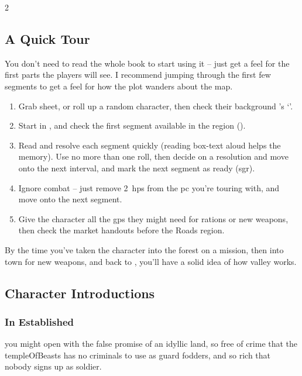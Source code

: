 \begin{multicols}{2}

\subsection{A Quick Tour}

You don't need to read the whole book to start using it -- just get a feel for the first parts the players will see.
I recommend jumping through the first few \glspl{segment} to get a feel for how the plot wanders about the map.

\begin{enumerate}
  \item
  Grab  sheet, or roll up a random character, then check their background 's `'.
  \item
  Start in  , and check the first \gls{segment} available in the \gls{region} ().
  \item
  Read and resolve each \gls{segment} quickly (reading box-text aloud helps the memory).
  Use no more than one roll, then decide on a resolution and move onto the next \gls{interval}, and mark the next \gls{segment} as ready (\gls{sgr}).
  \item
  Ignore combat -- just remove 2~\glspl{hp} from the \gls{pc} you're touring with, and move onto the next \gls{segment}.
  \item
  Give the character all the \glspl{gp} they might need for \glspl{ration} or new \glspl{weapon}, then check the market handouts before the Roads \gls{region}.
\end{enumerate}

By the time you've taken the character into the forest on a mission, then into \gls{town} for new weapons, and back to , you'll have a solid idea of how \gls{valley} works.

\subsection{Character Introductions}
\label{greyBackgrounds}

\subsubsection{In Established }
you might open with the false promise of an idyllic land, so free of crime that the \gls{templeOfBeasts} has no criminals to use as \gls{guard} \glspl{fodder}, and so rich that nobody signs up as  \gls{soldier}.


\end{multicols}
